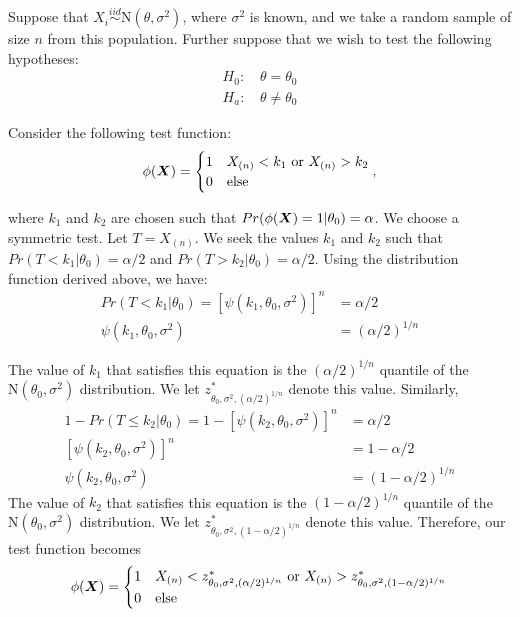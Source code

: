 \documentclass[]{article}
\newcommand{\bfX}{\mbox{\boldmath $X$}}
\begin{document}
Suppose that $X_i \stackrel{iid}{\sim} \text{N}(\theta, \sigma^2)$, where $\sigma^2$ is known, and we take a random sample of size $n$ from this population. Further suppose that we wish to test the following hypotheses:
\[
\begin{split}
\text{$H_0$: }& \theta = \theta_0 \\
\text{$H_a$: }& \theta \neq \theta_0
\end{split}
\]

Consider the following test function:
\[
\phi(\bfX) = \begin{cases}
1 & X_{(n)} < k_1 \text{ or } X_{(n)} > k_2 \\
0 & \text{else}
\end{cases},
\]

where $k_1$ and $k_2$ are chosen such that $Pr(\phi(\bfX) = 1|\theta_0) = \alpha$. We choose a symmetric test. Let $T = X_{(n)}$. We seek the values $k_1$ and $k_2$ such that $Pr(T < k_1 | \theta_0) = \alpha/2$ and $Pr(T > k_2 | \theta_0) = \alpha/2$. Using the distribution function derived above, we have:
\[
\begin{split}
Pr(T < k_1 | \theta_0) = [\psi(k_1, \theta_0, \sigma^2)]^n &= \alpha/2 \\
\psi(k_1, \theta_0, \sigma^2) &= (\alpha/2)^{1/n}
\end{split}
\]

The value of $k_1$ that satisfies this equation is the $(\alpha/2)^{1/n}$ quantile of the $\text{N}(\theta_0, \sigma^2)$ distribution. We let $z^*_{\theta_0, \sigma^2, (\alpha/2)^{1/n}}$ denote this value. Similarly,
\[
\begin{split}
1 - Pr(T \leq k_2 | \theta_0) = 1 - [\psi(k_2, \theta_0, \sigma^2)]^n&= \alpha/2 \\
[\psi(k_2, \theta_0, \sigma^2)]^n &= 1 - \alpha/2 \\
\psi(k_2, \theta_0, \sigma^2) &= (1 - \alpha/2)^{1/n}
\end{split}
\]
The value of $k_2$ that satisfies this equation is the $(1 - \alpha/2)^{1/n}$ quantile of the $\text{N}(\theta_0, \sigma^2)$ distribution. We let $z^*_{\theta_0, \sigma^2, (1 - \alpha/2)^{1/n}}$ denote this value. Therefore, our test function becomes
\[
\phi(\bfX) = \begin{cases}
1 & X_{(n)} < z^*_{\theta_0, \sigma^2, (\alpha/2)^{1/n}} \text{ or } X_{(n)} > z^*_{\theta_0, \sigma^2, (1 - \alpha/2)^{1/n}}\\
0 & \text{else}
\end{cases}
\]
\end{document}
